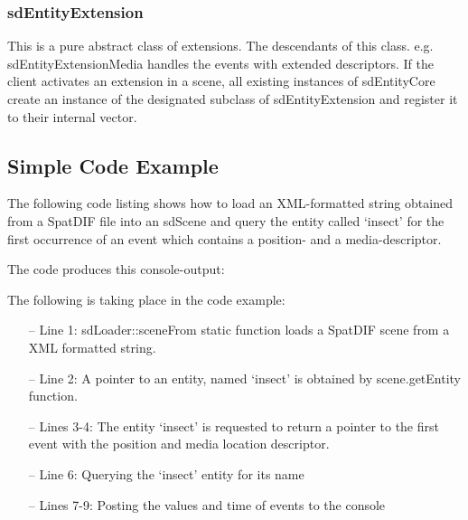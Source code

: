 \documentclass[a4paper]{article}
\begin{document}
\subsubsection{sdEntityExtension}
This is a pure abstract class of extensions. The descendants of this class. e.g. sdEntityExtensionMedia handles the events with extended descriptors. 
If the client activates an extension in a scene, all existing instances of sdEntityCore create an instance of the designated subclass of sdEntityExtension and register it to their internal vector.

\subsection{Simple Code Example}
The following code listing shows how to load an XML-formatted string obtained from a SpatDIF file into an sdScene and query the entity called `insect' for the first occurrence of an event which contains a position- and a media-descriptor.

\vfill

 


\noindent The code produces this console-output: 
 

\noindent 
The following is taking place in the code example:

\begin{itemize}[leftmargin=*]
\item[--] Line 1: sdLoader::sceneFrom static function loads a SpatDIF scene from a XML formatted string.
\item[--] Line 2: A pointer to an entity, named `insect' is obtained by scene.getEntity function.
\item[--] Lines 3-4: The entity `insect' is requested to return a pointer to the first event with the position and media location descriptor.
\item[--] Line 6: Querying the `insect' entity for its name
\item[--] Lines 7-9: Posting the values and time of events to the console
\end{itemize}

\end{document}
